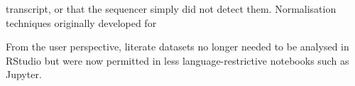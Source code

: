 


% 


transcript, or that the sequencer %
simply did not detect them. Normalisation techniques originally developed for




From the user perspective, literate datasets no longer needed to be analysed in RStudio but were now permitted in less language-restrictive notebooks such as Jupyter\citep{allaire2012rstudio,kluyver2016jupyter}.


